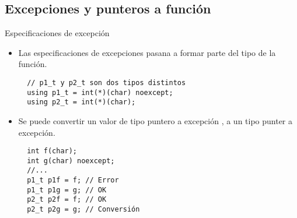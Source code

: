 \subsection{Excepciones y punteros a función}

\begin{frame}[t,fragile]{Especificaciones de excepción}
\begin{itemize}
  \item Las especificaciones de excepciones pasana a formar parte
        del tipo de la función.
\begin{lstlisting}
  // p1_t y p2_t son dos tipos distintos
  using p1_t = int(*)(char) noexcept;
  using p2_t = int(*)(char);
\end{lstlisting}
\vfill\pause
  \item Se puede convertir un valor de tipo puntero a excepción ,
        a un tipo punter a excepción.
\begin{lstlisting}
  int f(char);
  int g(char) noexcept;
  //...
  p1_t p1f = f; // Error 
  p1_t p1g = g; // OK 
  p2_t p2f = f; // OK
  p2_t p2g = g; // Conversión
\end{lstlisting}
\end{itemize}
\end{frame}

